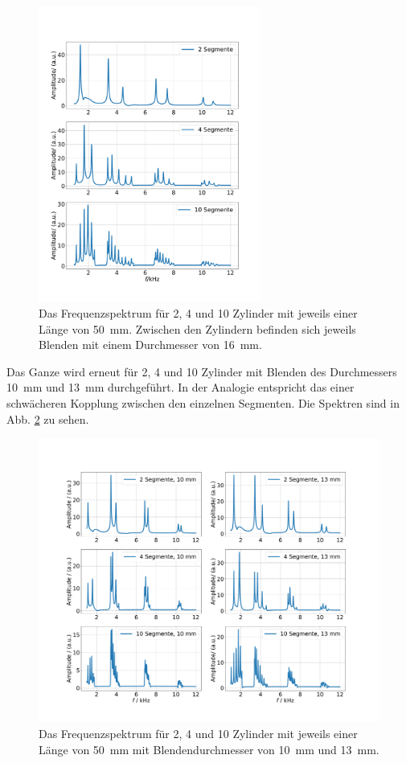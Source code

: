 \begin{figure}
    \centering
    \includegraphics[width=0.65\textwidth]{plots/B_1.pdf}
    \caption{Das Frequenzspektrum für \num{2}, \num{4} und \num{10} Zylinder mit jeweils einer Länge von \SI{50}{\milli\metre}. Zwischen den Zylindern befinden sich jeweils Blenden mit einem Durchmesser von \SI{16}{\milli\metre}.}
    \label{fig:spec10}
\end{figure}

Das Ganze wird erneut für \num{2}, \num{4} und \num{10} Zylinder mit Blenden des Durchmessers \SI{10}{\milli\meter} und \SI{13}{\milli\meter} durchgeführt. In der Analogie entspricht das einer schwächeren Kopplung zwischen den einzelnen Segmenten. Die Spektren sind in Abb. \ref{fig:spec10_13} zu sehen. 

\begin{figure}
    \centering
    \includegraphics[width=\textwidth]{plots/B_3.pdf}
    \caption{Das Frequenzspektrum für 2, 4 und 10 Zylinder mit jeweils einer Länge von \SI{50}{\milli\metre} mit Blendendurchmesser von \SI{10}{\milli\metre} und \SI{13}{\milli\metre}.}
    \label{fig:spec10_13}
\end{figure}

